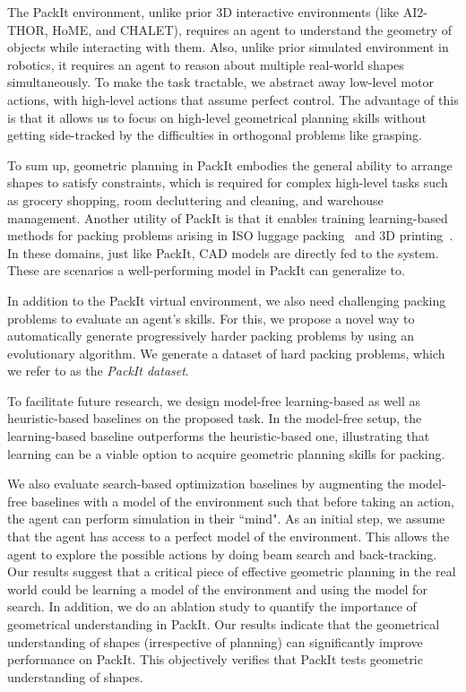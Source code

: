 \documentclass{article}
\begin{document}
The PackIt environment, unlike prior 3D interactive environments (like AI2-THOR, HoME, and CHALET), requires an agent to understand the geometry of objects while interacting with them. Also, unlike prior simulated environment in robotics, it requires an agent to reason about multiple real-world shapes simultaneously. To make the task tractable, we abstract away low-level motor actions, with high-level actions that assume perfect control. The advantage of this is that it allows us to focus on high-level geometrical planning skills without getting side-tracked by the difficulties in orthogonal problems like grasping.

To sum up, geometric planning in PackIt embodies the general ability to arrange shapes to satisfy constraints, which is required for complex high-level tasks such as grocery shopping, room decluttering and cleaning, and warehouse management. Another utility of PackIt is that it enables training learning-based methods for packing problems arising in ISO luggage packing~\cite{tiwari2010fast} and 3D printing~\cite{araujo2019analysis}. In these domains, just like PackIt, CAD models are directly fed to the system. These are scenarios a well-performing model in PackIt can generalize to.

In addition to the PackIt virtual environment, we also need challenging packing problems to evaluate an agent's skills. For this, we propose a novel way to automatically generate progressively harder packing problems by using an evolutionary algorithm. We generate a dataset of hard packing problems, which we refer to as the \textit{PackIt dataset}. 

To facilitate future research, we design model-free learning-based as well as heuristic-based baselines on the proposed task. In the model-free setup, the learning-based baseline outperforms the heuristic-based one, illustrating that learning can be a viable option to acquire geometric planning skills for packing. 

We also evaluate search-based optimization baselines by augmenting the model-free baselines with a model of the environment such that before taking an action, the agent can perform simulation in their ``mind". As an initial step, we assume that the agent has access to a perfect model of the environment. This allows the agent to explore the possible actions by doing beam search and back-tracking. Our results suggest that a critical piece of effective geometric planning in the real world could be learning a model of the environment and using the model for search. In addition, we do an ablation study to quantify the importance of geometrical understanding in PackIt. Our results indicate that the geometrical understanding of shapes (irrespective of planning) can significantly improve performance on PackIt. This objectively verifies that PackIt tests geometric understanding of shapes.
\end{document}
